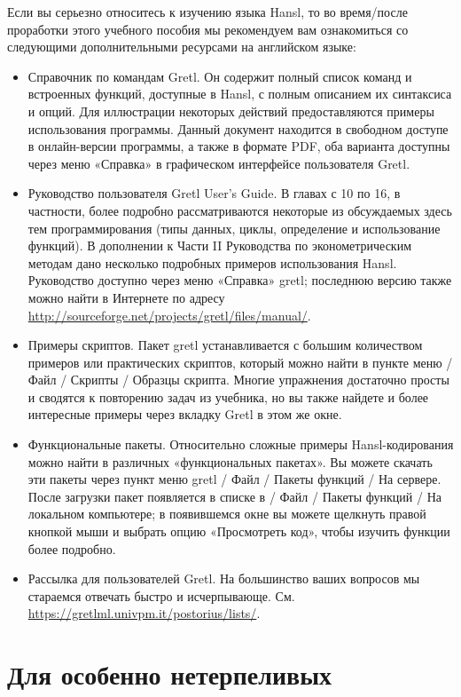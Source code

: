 \documentclass[oneside]{book}
\begin{document}
Если вы серьезно относитесь к изучению языка Hansl, то во время/после
проработки этого учебного пособия мы рекомендуем вам ознакомиться со
следующими дополнительными ресурсами на английском языке:
\begin{itemize}
\item Справочник по командам Gretl. Он содержит полный список команд и
  встроенных функций, доступные в Hansl, с полным описанием их
  синтаксиса и опций. Для иллюстрации некоторых действий
  предоставляются примеры использования программы. Данный документ
  находится в свободном доступе в онлайн-версии программы, а также в
  формате PDF, оба варианта доступны через меню «Справка» в
  графическом интерфейсе пользователя Gretl.
\item Руководство пользователя Gretl User's Guide. В главах с 10 по
  16, в частности, более подробно рассматриваются некоторые из
  обсуждаемых здесь тем программирования (типы данных, циклы,
  определение и использование функций). В дополнении к Части II
  Руководства по эконометрическим методам дано несколько подробных
  примеров использования Hansl. Руководство доступно через меню
  «Справка» gretl; последнюю версию также можно найти в Интернете по
  адресу \url{http://sourceforge.net/projects/gretl/files/manual/}.
\item Примеры скриптов. Пакет gretl устанавливается с большим
  количеством примеров или практических скриптов, который можно найти
  в пункте меню / Файл / Скрипты / Образцы скрипта. Многие упражнения
  достаточно просты и сводятся к повторению задач из учебника, но вы
  также найдете и более интересные примеры через вкладку Gretl в этом
  же окне.
\item Функциональные пакеты. Относительно сложные примеры
  Hansl-кодирования можно найти в различных «функциональных
  пакетах». Вы можете скачать эти пакеты через пункт меню gretl / Файл
  / Пакеты функций / На сервере. После загрузки пакет появляется в
  списке в / Файл / Пакеты функций / На локальном компьютере; в
  появившемся окне вы можете щелкнуть правой кнопкой мыши и выбрать
  опцию «Просмотреть код», чтобы изучить функции более подробно.
\item Рассылка для пользователей Gretl. На большинство ваших вопросов
  мы стараемся отвечать быстро и исчерпывающе. См.
  \url{https://gretlml.univpm.it/postorius/lists/}.
\end{itemize}

\chapter{Для особенно нетерпеливых}
\label{chap:impatient}
\end{document}
